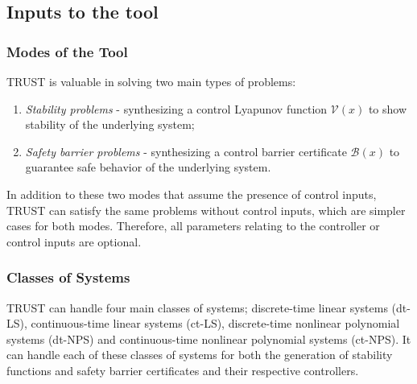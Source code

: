 \documentclass[sigconf]{acmart}
\begin{document}
\subsection{Inputs to the tool}\label{subsec:inputs-to-the-tool}

\subsubsection{Modes of the Tool}

\textsf{TRUST} is valuable in solving two main types of problems:
\begin{enumerate}
\item \emph{Stability problems} - synthesizing a control Lyapunov function $\mathcal{V}(x)$ to show stability of the underlying system;
\item \emph{Safety barrier problems} - synthesizing a control barrier certificate $\mathcal{B}(x)$ to guarantee safe behavior of the underlying system.
\end{enumerate}
In addition to these two modes that assume the presence of control inputs,  \textsf{TRUST} can satisfy the same problems without control inputs, which are simpler cases for both modes.
Therefore, all parameters relating to the controller or control inputs are optional.

\subsubsection{Classes of Systems}

\textsf{TRUST} can handle four main classes of systems; discrete-time linear systems (dt-LS), continuous-time linear systems (ct-LS), discrete-time nonlinear polynomial systems (dt-NPS) and continuous-time nonlinear polynomial systems (ct-NPS). It can handle each of these classes of systems for both the generation of stability functions and safety barrier certificates and their respective controllers.
\end{document}
